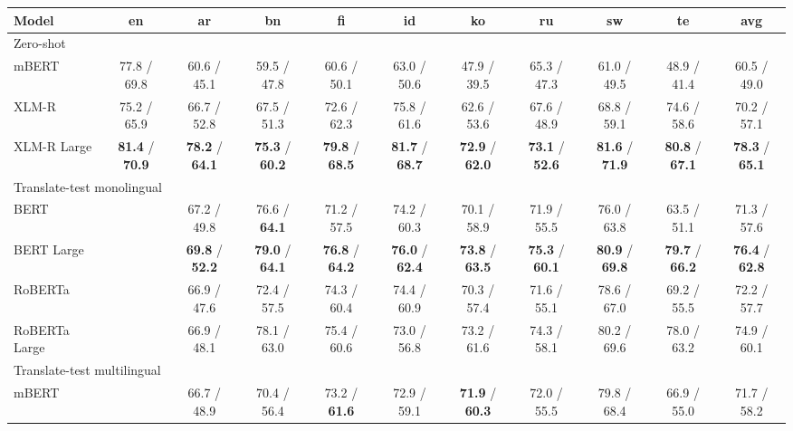 \documentclass[11pt]{article}
\begin{document}
\begin{table*}[!ht]
    \centering
    \begin{adjustbox}{max width=\textwidth}
    \begin{tabular}{l|ccccccccc|c}
        \toprule
        Model & en & ar & bn & fi & id & ko & ru & sw & te & avg \\
        \midrule
        \multicolumn{11}{l}{Zero-shot} \\
        \midrule
        mBERT & 77.8 / 69.8 & 60.6 / 45.1 & 59.5 / 47.8 & 60.6 / 50.1 & 63.0 / 50.6 & 47.9 / 39.5 & 65.3 / 47.3 & 61.0 / 49.5 & 48.9 / 41.4 & 60.5 / 49.0  \\
        XLM-R & 75.2 / 65.9 & 66.7 / 52.8 & 67.5 / 51.3 & 72.6 / 62.3 & 75.8 / 61.6 & 62.6 / 53.6 & 67.6 / 48.9 & 68.8 / 59.1 & 74.6 / 58.6 & 70.2 / 57.1  \\
        XLM-R Large & \textbf{81.4} / \textbf{70.9} & \textbf{78.2} / \textbf{64.1} & \textbf{75.3} / \textbf{60.2} & \textbf{79.8} / \textbf{68.5} & \textbf{81.7} / \textbf{68.7} & \textbf{72.9} / \textbf{62.0} & \textbf{73.1} / \textbf{52.6} & \textbf{81.6} / \textbf{71.9} & \textbf{80.8} / \textbf{67.1} & \textbf{78.3} / \textbf{65.1}\\
        \midrule
        \multicolumn{11}{l}{Translate-test monolingual} \\
        \midrule
        BERT & ~ & 67.2 / 49.8 & 76.6 / \textbf{64.1} & 71.2 / 57.5 & 74.2 / 60.3 & 70.1 / 58.9 & 71.9 / 55.5 & 76.0 / 63.8 & 63.5 / 51.1 & 71.3 / 57.6 \\
        BERT Large & ~ & \textbf{69.8} / \textbf{52.2} & \textbf{79.0} / \textbf{64.1} & \textbf{76.8} / \textbf{64.2} & \textbf{76.0} / \textbf{62.4} & \textbf{73.8} / \textbf{63.5} & \textbf{75.3} / \textbf{60.1} & \textbf{80.9} / \textbf{69.8} & \textbf{79.7} / \textbf{66.2} & \textbf{76.4} / \textbf{62.8} \\
        RoBERTa & ~ & 66.9 / 47.6 & 72.4 / 57.5 & 74.3 / 60.4 & 74.4 / 60.9 & 70.3 / 57.4 & 71.6 / 55.1 & 78.6 / 67.0 & 69.2 / 55.5 & 72.2 / 57.7 \\
        RoBERTa Large & ~ & 66.9 / 48.1 & 78.1 / 63.0 & 75.4 / 60.6 & 73.0 / 56.8 & 73.2 / 61.6 & 74.3 / 58.1 & 80.2 / 69.6 & 78.0 / 63.2 & 74.9 / 60.1\\
        \midrule
        \multicolumn{11}{l}{Translate-test multilingual} \\
        \midrule
        mBERT & ~ & 66.7 / 48.9 & 70.4 / 56.4 & 73.2 / \textbf{61.6} & 72.9 / 59.1 & \textbf{71.9} / \textbf{60.3} & 72.0 / 55.5 & 79.8 / 68.4 & 66.9 / 55.0 & 71.7 / 58.2 \\

\end{tabular}
\end{adjustbox}
\end{table*}
\end{document}
